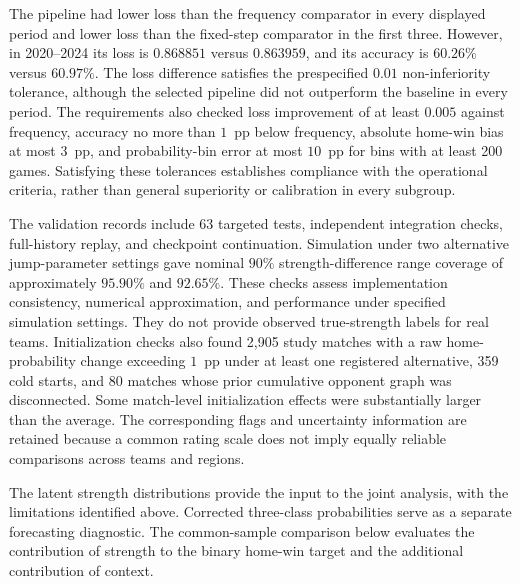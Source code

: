 \begin{table}[htbp]
\centering\small
{}
\label{tab:rating-validation}

\end{table}

The pipeline had lower loss than the frequency comparator in every displayed period and lower loss than the fixed-step comparator in the first three. However, in 2020--2024 its loss is $0.868851$ versus $0.863959$, and its accuracy is $60.26\%$ versus $60.97\%$. The loss difference satisfies the prespecified $0.01$ non-inferiority tolerance, although the selected pipeline did not outperform the baseline in every period. The requirements also checked loss improvement of at least $0.005$ against frequency, accuracy no more than $1$~pp below frequency, absolute home-win bias at most $3$~pp, and probability-bin error at most $10$~pp for bins with at least 200 games. Satisfying these tolerances establishes compliance with the operational criteria, rather than general superiority or calibration in every subgroup.

The validation records include 63 targeted tests, independent integration checks, full-history replay, and checkpoint continuation. Simulation under two alternative jump-parameter settings gave nominal $90\%$ strength-difference range coverage of approximately $95.90\%$ and $92.65\%$. These checks assess implementation consistency, numerical approximation, and performance under specified simulation settings. They do not provide observed true-strength labels for real teams. Initialization checks also found 2,905 study matches with a raw home-probability change exceeding $1$~pp under at least one registered alternative, 359 cold starts, and 80 matches whose prior cumulative opponent graph was disconnected. Some match-level initialization effects were substantially larger than the average. The corresponding flags and uncertainty information are retained because a common rating scale does not imply equally reliable comparisons across teams and regions.

The latent strength distributions provide the input to the joint analysis, with the limitations identified above. Corrected three-class probabilities serve as a separate forecasting diagnostic. The common-sample comparison below evaluates the contribution of strength to the binary home-win target and the additional contribution of context.

